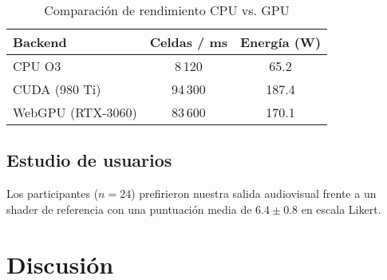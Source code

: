 \documentclass{report}
\begin{document}
\begin{table}[ht]
  \centering
  \caption{Comparación de rendimiento CPU vs. GPU}
  \label{tab:perf}
  \begin{tabular}{lS[table-format=4.0]S[table-format=2.1]}
    \toprule
    Backend & {Celdas / ms} & {Energía (W)} \\
    \midrule
    CPU O3           & 8\,120 & 65.2 \\
    CUDA (980 Ti)    & 94\,300 & 187.4 \\
    WebGPU (RTX-3060)& 83\,600 & 170.1 \\
    \bottomrule
  \end{tabular}
\end{table}

\section{Estudio de usuarios}
Los participantes (\(n=24\)) prefirieron nuestra salida audiovisual frente a un
shader de referencia con una puntuación media de \(6.4\pm0.8\) en escala Likert.

\chapter{Discusión}
\blindtext
\end{document}
